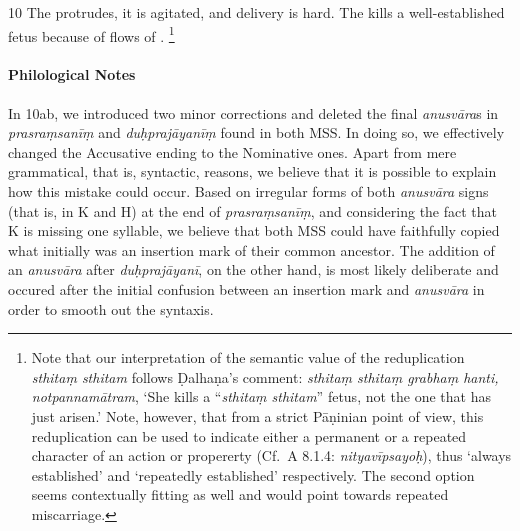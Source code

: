 \begin{translation}
\item [10] The  protrudes, it is agitated, and delivery is hard.
The  kills a well-established fetus because of flows of .%
	\footnote{%
	Note that our interpretation of the semantic value of the reduplication \emph{sthitaṃ sthitam} follows Ḍalhaṇa's comment: \emph{sthitaṃ sthitaṃ grabhaṃ hanti, notpannamātram}, ‘She kills a “\emph{sthitaṃ sthitam}” fetus, not the one that has just arisen.’ Note, however, that from a strict Pāṇinian point of view, this reduplication can be used to indicate either a permanent or a repeated character of an action or propererty (Cf.\ A 8.1.4: \emph{nityavīpsayoḥ}), thus ‘always established’ and ‘repeatedly established’ respectively. The second option seems contextually fitting as well and would point towards repeated miscarriage.%
	}
\end{translation}

\paragraph*{Philological Notes}
In 10ab, we introduced two minor corrections and deleted the final \emph{anusvāra}s in \emph{prasraṃsanīṃ} and \emph{duḥprajāyanīṃ} found in both MSS. In doing so, we effectively changed the Accusative ending to the Nominative ones. Apart from mere grammatical, that is, syntactic, reasons, we believe that it is possible to explain how this mistake could occur. Based on irregular forms of both \emph{anusvāra} signs (that is, in K and H) at the end of \emph{prasraṃsanīṃ}, and considering the fact that K is missing one syllable, we believe that both MSS could have faithfully copied what initially was an insertion mark of their common ancestor. The addition of an \emph{anusvāra} after \emph{duḥprajāyanī}, on the other hand, is most likely deliberate and occured after the initial confusion between an insertion mark and \emph{anusvāra} in order to smooth out the syntaxis.  

